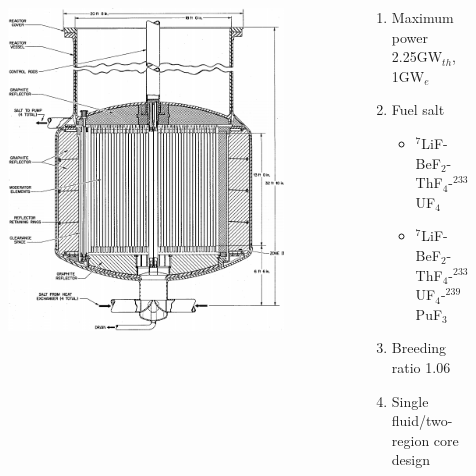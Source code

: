 \begin{frame}
\begin{columns}
\begin{figure}[t]
                \includegraphics[height=0.7\textwidth]{./images/msbr_plain.png}
                \vspace*{-0.2in}
      \end{figure}
   \begin{block}{ \cite{robertson_conceptual_1971}}
       \begin{enumerate}
       \item Maximum power 2.25GW$_{th}$, 1GW$_e$
       \item Fuel salt
         \begin{itemize}
         \item $^7$LiF-BeF$_2$-ThF$_4$-$^{233}$UF$_4$
         \item $^7$LiF-BeF$_2$-ThF$_4$-$^{233}$UF$_4$-$^{239}$PuF$_3$
         \end{itemize}  
       \item Breeding ratio 1.06
       \item Single fluid/two-region core design
      \end{enumerate}
     \end{block}
  \end{columns}
              
 \end{frame}

